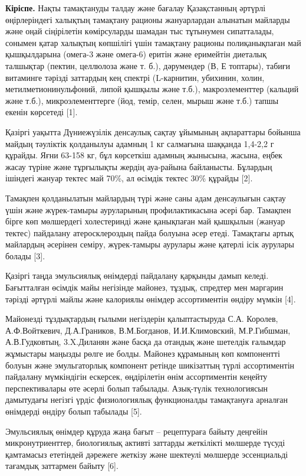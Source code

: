 \begin{multicols}{2}
{\bfseries Кіріспе.} Нақты тамақтануды талдау және бағалау Қазақстанның
әртүрлі өңірлеріндегі халықтың тамақтану рационы жануарлардан алынатын
майларды және оңай сіңірілетін көмірсуларды шамадан тыс тұтынумен
сипатталады, сонымен қатар халықтың көпшілігі үшін тамақтану рационы
полиқанықпаған май қышқылдарына (омега-3 және омега-6) еритін және
еримейтін диеталық талшықтар (пектин, целлюлоза және т. б.), дәрумендер
(В, Е топтары), табиғи витаминге тәрізді заттардың кең спектрі
(L-карнитин, убихинин, холин, метилметионинульфоний, липой қышқылы және
т.б.), макроэлементтер (кальций және т.б.), микроэлементтерге (йод,
темір, селен, мырыш және т.б.) тапшы екенін көрсетеді {[}1{]}.

Қазіргі уақытта Дүниежүзілік денсаулық сақтау ұйымының ақпараттары
бойынша майдың тәуліктік қолданылуы адамның 1 кг салмағына шаққанда
1,4-2,2 г құрайды. Яғни 63-158 кг, бұл көрсеткіш адамның жынысына,
жасына, еңбек жасау түріне және тұрғылықты жердің ауа-райына байланысты.
Бұлардың ішіндегі жануар тектес май 70\%, ал өсімдік тектес 30\% құрайды
{[}2{]}.

Тамақпен қолданылатын майлардың түрі және саны адам денсаулығын сақтау
үшін және жүрек-тамыры ауруларының профилактикасына әсері бар. Тамақпен
бірге көп мөлшердегі холестеринді және қанықпаған май қышқылын (жануар
тектес) пайдалану атеросклероздың пайда болуына әсер етеді. Тамақтағы
артық майлардың әсерінен семіру, жүрек-тамыры аурулары және қатерлі ісік
аурулары болады {[}3{]}.

Қазіргі таңда эмульсиялық өнімдерді пайдалану қарқынды дамып келеді.
Бағытталған өсімдік майы негізінде майонез, тұздық, спредтер мен
маргарин тәрізді әртүрлі майлы және калориялы өнімдер ассортиментін
өндіру мүмкін {[}4{]}.

Майонезді тұздықтардың ғылыми негіздерін қалыптастыруда С.А. Королев,
А.Ф.Войткевич, Д.А.Граников, В.М.Богданов, И.И.Климовский, М.Р.Гибшман,
А.В.Гудковтың, 3.X.Диланян және басқа да отандық және шетелдік ғалымдар
жұмыстары маңызды рөлге ие болды. Майонез құрамының көп компонентті
болуын және эмульгаторлық компонент ретінде шикізаттың түрлі
ассортиментін пайдалану мүмкіндігін ескерсек, өңдірілетін өнім
ассортиментін кеңейту перспективалары өте әсерлі болып табылады.
Азық-түлік технологиясын дамытудағы негізгі үрдіс физиологиялық
функционалды тамақтануға арналған өнімдерді өндіру болып табылады
{[}5{]}.

Эмульсиялық өнімдер құруда жаңа бағыт -- рецептураға байыту деңгейін
микронутриенттер, биологиялық активті заттарды жеткілікті мөлшерде
түсуді қамтамасыз ететіндей дәрежеге жеткізу және шектеулі мөлшерде
эссенциальді тағамдық заттармен байыту {[}6{]}.


\end{multicols}
